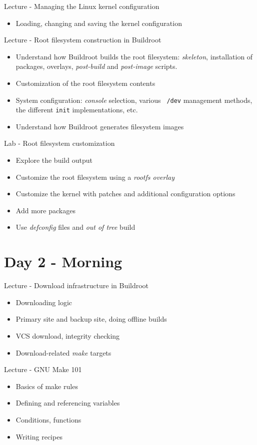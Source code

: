 \documentclass[a4paper,12pt,obeyspaces,spaces,hyphens]{article}
\begin{document}
\feagendatwocolumn
{Lecture - Managing the Linux kernel configuration}
{
  \begin{itemize}
  \item Loading, changing and saving the kernel configuration
  \end{itemize}
}
{Lecture - Root filesystem construction in Buildroot}
{
  \begin{itemize}
  \item Understand how Buildroot builds the root filesystem: {\em
      skeleton}, installation of packages, overlays, {\em post-build}
    and {\em post-image} scripts.
  \item Customization of the root filesystem contents
  \item System configuration: {\em console} selection, various {\tt
      /dev} management methods, the different {\tt init}
    implementations, etc.
  \item Understand how Buildroot generates filesystem images
  \end{itemize}
}

\feagendaonecolumn
{Lab - Root filesystem customization}
{
  \begin{itemize}
  \item Explore the build output
  \item Customize the root filesystem using a {\em rootfs overlay}
  \item Customize the kernel with patches and additional configuration
    options
  \item Add more packages
  \item Use {\em defconfig} files and {\em out of tree} build
  \end{itemize}
}

\section{Day 2 - Morning}

\feagendatwocolumn
{Lecture - Download infrastructure in Buildroot}
{
  \begin{itemize}
  \item Downloading logic
  \item Primary site and backup site, doing offline builds
  \item VCS download, integrity checking
  \item Download-related {\em make} targets
  \end{itemize}
}
{Lecture - GNU Make 101}
{
  \begin{itemize}
  \item Basics of make rules
  \item Defining and referencing variables
  \item Conditions, functions
  \item Writing recipes
  \end{itemize}
}
\end{document}
